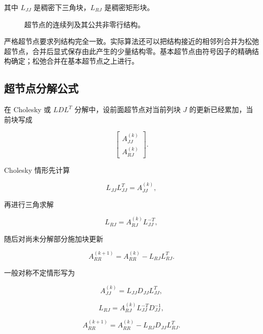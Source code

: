 其中 $L_{JJ}$ 是稠密下三角块，$L_{RJ}$ 是稠密矩形块。

\begin{figure}[htbp]
\centering
{}
\caption{超节点的连续列及其公共非零行结构。}
\label{fig:supernode-structure}
\end{figure}

严格超节点要求列结构完全一致。实际算法还可以把结构接近的相邻列合并为松弛超节点，合并后显式保存由此产生的少量结构零。基本超节点由符号因子的精确结构确定；松弛合并在基本超节点之上进行\cite{demmel1999}。

\subsection{超节点分解公式}

在 Cholesky 或 $LDL^T$ 分解中，设前面超节点对当前列块 $J$ 的更新已经累加，当前块写成

\[
\begin{bmatrix}
A_{JJ}^{(k)}\\
A_{RJ}^{(k)}
\end{bmatrix}.
\]

Cholesky 情形先计算

\[
L_{JJ}L_{JJ}^T=A_{JJ}^{(k)},
\]

再进行三角求解

\[
L_{RJ}=A_{RJ}^{(k)}L_{JJ}^{-T},
\]

随后对尚未分解部分施加块更新

\[
A_{RR}^{(k+1)}=A_{RR}^{(k)}-L_{RJ}L_{RJ}^T.
\]

一般对称不定情形写为

\[
A_{JJ}^{(k)}=L_{JJ}D_{JJ}L_{JJ}^T,
\]

\[
L_{RJ}=A_{RJ}^{(k)}L_{JJ}^{-T}D_{JJ}^{-1},
\]

\[
A_{RR}^{(k+1)}=A_{RR}^{(k)}-L_{RJ}D_{JJ}L_{RJ}^T.
\]

